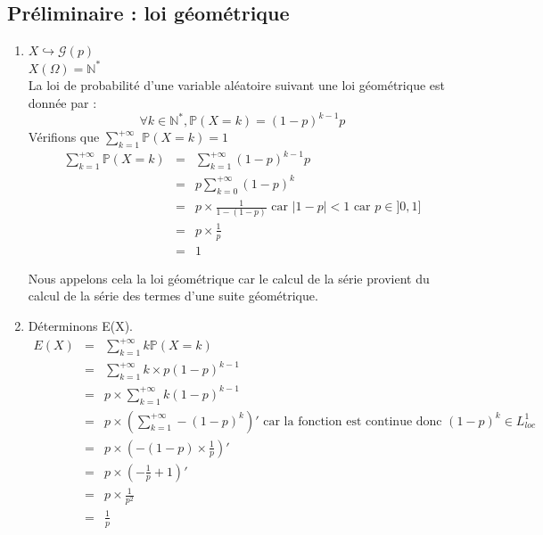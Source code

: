 \documentclass{article}
\begin{document}
\subsection{Préliminaire : loi géométrique}
\begin{enumerate}
\item $X\hookrightarrow \mathcal{G}(p)$ \\
$X(\Omega)=\mathbb{N}^*$\\
La loi de probabilité d'une variable aléatoire suivant une loi géométrique est donnée par :
\[\forall k\in \mathbb{N}^*, \mathbb{P}(X=k)=(1-p)^{k-1} p\]
Vérifions que $\sum_{k=1}^{+\infty} \mathbb{P}(X=k)=1$
\begin{eqnarray*}
\sum_{k=1}^{+\infty} \mathbb{P}(X=k) &=& \sum_{k=1}^{+\infty} (1-p)^{k-1} p \\
				     &=& p \sum_{k=0}^{+\infty} (1-p)^k \\
				     &=& p \times \frac{1}{1-(1-p)} \text{ car }|1-p| <1 \text{ car } p\in]0,1] \\
				     &=& p\times\frac{1}{p} \\
				     &=& 1
\end{eqnarray*}

\bigskip
Nous appelons cela la loi géométrique car le calcul de la série provient du calcul de la série des termes d'une suite géométrique. 

\item Déterminons E(X).
\begin{eqnarray*}
E(X)&=&\sum_{k=1}^{+\infty} k \mathbb{P}(X=k) \\
    &=&\sum_{k=1}^{+\infty} k\times p (1-p)^{k-1} \\
    &=&p\times \sum_{k=1}^{+\infty} k(1-p)^{k-1} \\
    &=&p\times \left( \sum_{k=1}^{+\infty} -(1-p)^k \right)' \text{ car la fonction est continue donc }(1-p)^k\in L^1_{loc} \\
    &=&p\times \left(-(1-p)\times\frac{1}{p}\right)' \\
    &=&p\times\left(-\frac{1}{p}+1\right) ' \\
    &=& p\times\frac{1}{p^2} \\
    &=& \frac{1}{p}
\end{eqnarray*}


\end{enumerate}
\end{document}
